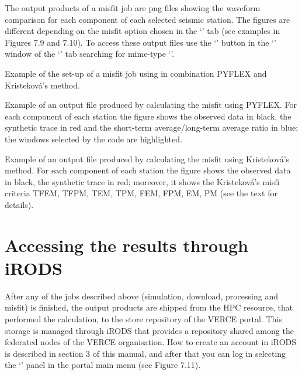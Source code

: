 \documentclass[english]{book}
\begin{document}
The output products of a misfit job are png files showing the waveform
comparison for each component of each selected seismic station. The
figures are different depending on the misfit option chosen in the
‘’ tab (see examples in Figures 7.9 and 7.10). To access
these output files use the ‘’ button in the ‘’ window of the ‘’ tab searching for mime-type
‘’.


 Example of the set-up of a misfit job using in
combination PYFLEX and Kristeková’s method.


 Example of an output file produced by calculating the
misfit using PYFLEX. For each component of each station the figure shows
the observed data in black, the synthetic trace in red and the
short-term average/long-term average ratio in blue; the windows selected
by the code are highlighted.


 Example of an output file produced by calculating the
misfit using Kristeková’s method. For each component of each station the
figure shows the observed data in black, the synthetic trace in red;
moreover, it shows the Kristeková’s misfi criteria TFEM, TFPM, TEM, TPM,
FEM, FPM, EM, PM (see the text for details).


\section{Accessing the results through iRODS}
\label{\detokenize{Section7:accessing-the-results-through-irods}}
After any of the jobs described above (simulation, download, processing
and misfit) is finished, the output products are shipped from the HPC
resource, that performed the calculation, to the store repository of the
VERCE portal. This storage is managed through iRODS that provides a
repository shared among the federated nodes of the VERCE organisation.
How to create an account in iRODS is described in section 3 of this
manual, and after that you can log in selecting the ‘’ panel
in the portal main menu (see Figure 7.11).

\end{document}
